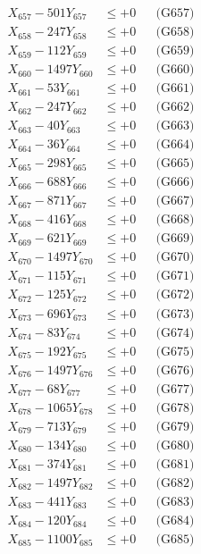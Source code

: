 \documentclass[a4paper,10pt]{article}
\begin{document}
{\begin{align}
X_{657} - 501Y_{657} &\leq +0 && \text{(G657)} \\
X_{658} - 247Y_{658} &\leq +0 && \text{(G658)} \\
X_{659} - 112Y_{659} &\leq +0 && \text{(G659)} \\
X_{660} - 1497Y_{660} &\leq +0 && \text{(G660)} \\
\allowbreak
X_{661} - 53Y_{661} &\leq +0 && \text{(G661)} \\
X_{662} - 247Y_{662} &\leq +0 && \text{(G662)} \\
X_{663} - 40Y_{663} &\leq +0 && \text{(G663)} \\
X_{664} - 36Y_{664} &\leq +0 && \text{(G664)} \\
X_{665} - 298Y_{665} &\leq +0 && \text{(G665)} \\
X_{666} - 688Y_{666} &\leq +0 && \text{(G666)} \\
X_{667} - 871Y_{667} &\leq +0 && \text{(G667)} \\
X_{668} - 416Y_{668} &\leq +0 && \text{(G668)} \\
X_{669} - 621Y_{669} &\leq +0 && \text{(G669)} \\
X_{670} - 1497Y_{670} &\leq +0 && \text{(G670)} \\
\allowbreak
X_{671} - 115Y_{671} &\leq +0 && \text{(G671)} \\
X_{672} - 125Y_{672} &\leq +0 && \text{(G672)} \\
X_{673} - 696Y_{673} &\leq +0 && \text{(G673)} \\
X_{674} - 83Y_{674} &\leq +0 && \text{(G674)} \\
X_{675} - 192Y_{675} &\leq +0 && \text{(G675)} \\
X_{676} - 1497Y_{676} &\leq +0 && \text{(G676)} \\
X_{677} - 68Y_{677} &\leq +0 && \text{(G677)} \\
X_{678} - 1065Y_{678} &\leq +0 && \text{(G678)} \\
X_{679} - 713Y_{679} &\leq +0 && \text{(G679)} \\
X_{680} - 134Y_{680} &\leq +0 && \text{(G680)} \\
\allowbreak
X_{681} - 374Y_{681} &\leq +0 && \text{(G681)} \\
X_{682} - 1497Y_{682} &\leq +0 && \text{(G682)} \\
X_{683} - 441Y_{683} &\leq +0 && \text{(G683)} \\
X_{684} - 120Y_{684} &\leq +0 && \text{(G684)} \\
X_{685} - 1100Y_{685} &\leq +0 && \text{(G685)} \\

\end{align}}
\end{document}
